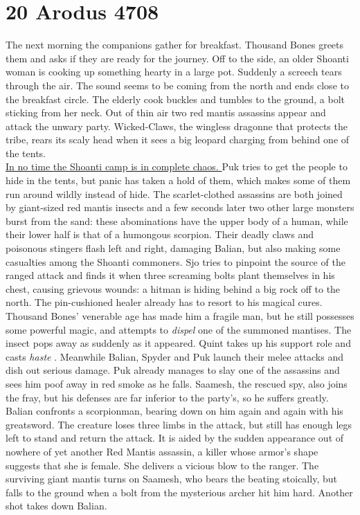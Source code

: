 \section{20 Arodus 4708}

The next morning the companions gather for breakfast. Thousand Bones greets them and asks if they are ready for the journey. Off to the side, an older Shoanti woman is cooking up something hearty in a large pot. Suddenly a screech tears through the air. The sound seems to be coming from the north and ends close to the breakfast circle. The elderly cook buckles and tumbles to the ground, a bolt sticking from her neck. Out of thin air two red mantis assassins appear and attack the unwary party. Wicked-Claws, the wingless dragonne that protects the tribe, rears its scaly head when it sees a big leopard charging from behind one of the tents.\\

\hyperref[fig:Red-Mantis-assault-on-Shoanti-603326119]{ In no time the Shoanti camp is in complete chaos. } Puk tries to get the people to hide in the tents, but panic has taken a hold of them, which makes some of them run around wildly instead of hide. The scarlet-clothed assassins are both joined by giant-sized red mantis insects and a few seconds later two other large monsters burst from the sand: these abominations have the upper body of a human, while their lower half is that of a humongous scorpion. Their deadly claws and poisonous stingers flash left and right, damaging Balian, but also making some casualties among the Shoanti commoners. Sjo tries to pinpoint the source of the ranged attack and finds it when three screaming bolts plant themselves in his chest, causing grievous wounds: a hitman is hiding behind a big rock off to the north. The pin-cushioned healer already has to resort to his magical cures. Thousand Bones' venerable age has made him a fragile man, but he still possesses some powerful magic, and attempts to  {\itshape dispel} one of the summoned mantises. The insect pops away as suddenly as it appeared. Quint takes up his support role and casts  {\itshape haste} . Meanwhile Balian, Spyder and Puk launch their melee attacks and dish out serious damage. Puk already manages to slay one of the assassins and sees him poof away in red smoke as he falls. Saamesh, the rescued spy, also joins the fray, but his defenses are far inferior to the party's, so he suffers greatly. Balian confronts a scorpionman, bearing down on him again and again with his greatsword. The creature loses three limbs in the attack, but still has enough legs left to stand and return the attack. It is aided by the sudden appearance out of nowhere of yet another Red Mantis assassin, a killer whose armor's shape suggests that she is female. She delivers a vicious blow to the ranger. The surviving giant mantis turns on Saamesh, who bears the beating stoically, but falls to the ground when a bolt from the mysterious archer hit him hard. Another shot takes down Balian. \\

